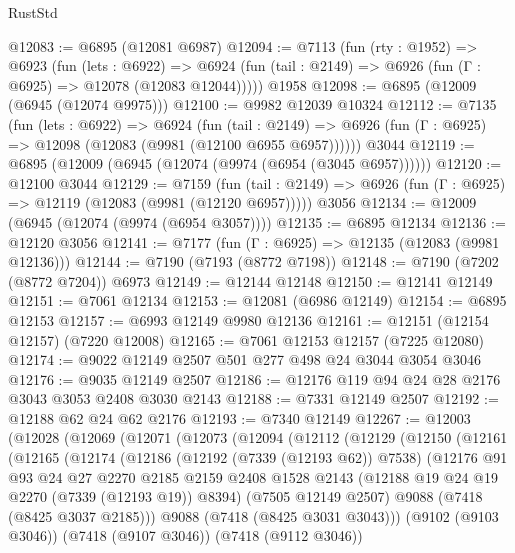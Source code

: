 \begin{lexlean}{RustStd}
\begin{coremodule}
@12083 := @6895 (@12081 @6987)
@12094 := @7113
    (fun (rty : @1952) =>
    @6923
      (fun (lets : @6922) =>
      @6924 (fun (tail : @2149) => @6926 (fun (Γ : @6925) => @12078 (@12083 @12044)))))
    @1958
@12098 := @6895 (@12009 (@6945 (@12074 @9975)))
@12100 := @9982 @12039 @10324
@12112 := @7135
    (fun (lets : @6922) =>
    @6924
      (fun (tail : @2149) =>
      @6926 (fun (Γ : @6925) => @12098 (@12083 (@9981 (@12100 @6955 @6957))))))
    @3044
@12119 := @6895 (@12009 (@6945 (@12074 (@9974 (@6954 (@3045 @6957))))))
@12120 := @12100 @3044
@12129 := @7159
    (fun (tail : @2149) => @6926 (fun (Γ : @6925) => @12119 (@12083 (@9981 (@12120 @6957)))))
    @3056
@12134 := @12009 (@6945 (@12074 (@9974 (@6954 @3057))))
@12135 := @6895 @12134
@12136 := @12120 @3056
@12141 := @7177 (fun (Γ : @6925) => @12135 (@12083 (@9981 @12136)))
@12144 := @7190 (@7193 (@8772 @7198))
@12148 := @7190 (@7202 (@8772 @7204)) @6973
@12149 := @12144 @12148
@12150 := @12141 @12149
@12151 := @7061 @12134
@12153 := @12081 (@6986 @12149)
@12154 := @6895 @12153
@12157 := @6993 @12149 @9980 @12136
@12161 := @12151 (@12154 @12157) (@7220 @12008)
@12165 := @7061 @12153 @12157 (@7225 @12080)
@12174 := @9022 @12149 @2507 @501 @277 @498 @24 @3044 @3054 @3046
@12176 := @9035 @12149 @2507
@12186 := @12176 @119 @94 @24 @28 @2176 @3043 @3053 @2408 @3030 @2143
@12188 := @7331 @12149 @2507
@12192 := @12188 @62 @24 @62 @2176
@12193 := @7340 @12149
@12267 := @12003
    (@12028
      (@12069
        (@12071
          (@12073
            (@12094
              (@12112
                (@12129
                  (@12150
                    (@12161
                      (@12165
                        (@12174
                          (@12186
                            (@12192 (@7339 (@12193 @62)) @7538)
                            (@12176
                              @91
                              @93
                              @24
                              @27
                              @2270
                              @2185
                              @2159
                              @2408
                              @1528
                              @2143
                              (@12188 @19 @24 @19 @2270 (@7339 (@12193 @19)) @8394)
                              (@7505 @12149 @2507)
                              @9088
                              (@7418 (@8425 @3037 @2185)))
                            @9088
                            (@7418 (@8425 @3031 @3043)))
                          (@9102 (@9103 @3046))
                          (@7418 (@9107 @3046))
                          (@7418 (@9112 @3046))

\end{coremodule}
\end{lexlean}
